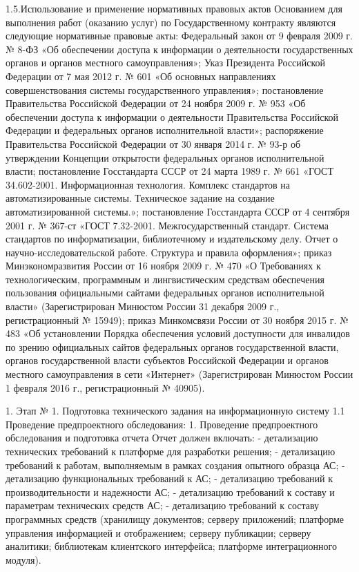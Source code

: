 1.5.Использование и применение нормативных правовых актов 
Основанием для выполнения работ (оказанию услуг) по Государственному контракту являются следующие нормативные правовые акты:
Федеральный закон от 9 февраля 2009 г. № 8-ФЗ «Об обеспечении доступа к информации о деятельности государственных органов и органов местного самоуправления»;
Указ Президента Российской Федерации от 7 мая 2012 г. № 601 «Об основных направлениях совершенствования системы государственного управления»;
постановление Правительства Российской Федерации от 24 ноября 2009 г. № 953 «Об обеспечении доступа к информации о деятельности Правительства Российской Федерации и федеральных органов исполнительной власти»;
распоряжение Правительства Российской Федерации от 30 января 2014 г. № 93-р об утверждении Концепции открытости федеральных органов исполнительной власти;
постановление Госстандарта СССР от 24 марта 1989 г. № 661 «ГОСТ 34.602-2001. Информационная технология. Комплекс стандартов на автоматизированные системы. Техническое задание на создание автоматизированной системы.»;
постановление Госстандарта СССР от 4 сентября 2001 г. № 367-ст «ГОСТ 7.32-2001. Межгосударственный стандарт. Система стандартов по информатизации, библиотечному и издательскому делу. Отчет о научно-исследовательской работе. Структура и правила оформления»;
приказ Минэкономразвития России от 16 ноября 2009 г. № 470 «О Требованиях к технологическим, программным и лингвистическим средствам обеспечения пользования официальными сайтами федеральных органов исполнительной власти» (Зарегистрирован Минюстом России 31 декабря 2009 г., регистрационный № 15949);
приказ Минкомсвязи России от 30 ноября 2015 г. № 483 «Об установлении Порядка обеспечения условий доступности для инвалидов по зрению официальных сайтов федеральных органов государственной власти, органов государственной власти субъектов Российской Федерации и органов местного самоуправления в сети «Интернет» (Зарегистрирован Минюстом России 1 февраля 2016 г., регистрационный № 40905).


1.
Этап № 1. Подготовка технического задания на информационную систему
1.1
Проведение предпроектного обследования:
1. Проведение  предпроектного обследования и подготовка отчета  
Отчет должен включать:  
- детализацию технических требований к платформе для разработки решения;
- детализацию требований к работам, выполняемым в рамках создания опытного образца АС;
- детализацию функциональных требований к АС;
- детализацию требований к производительности и надежности АС;
- детализацию  требований к составу и параметрам технических средств АС;
- детализацию  требований к составу программных средств (хранилищу документов;  серверу приложений; платформе управления информацией и отображением; серверу публикации; серверу аналитики; библиотекам клиентского интерфейса; платформе интеграционного модуля).

